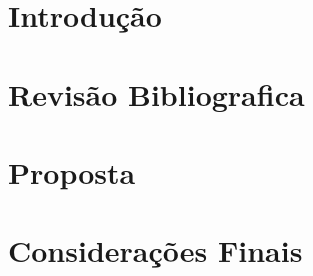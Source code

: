 \documentclass{ufscThesis} %
\begin{document}
\capa
\folhaderosto%

\paginaresumo
\sumario

\chapter{Introdu\c{c}\~ao}


\chapter{Revis\~ao Bibliografica}


\chapter{Proposta}


\chapter{Considera\c{c}\~oes Finais}






%
\end{document}
